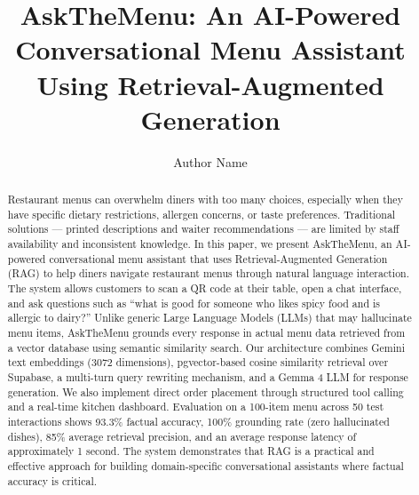 \documentclass[a4paper,fleqn]{cas-dc}
\begin{document}
\let\WriteBookmarks\relax
\def\floatpagepagefraction{1}
\def\textpagefraction{.001}



\title[mode = title]{AskTheMenu: An AI-Powered Conversational Menu Assistant Using Retrieval-Augmented Generation}

\tnotemark[1]


\author[1]{Author Name}
\cormark[1]
\fnmark[1]





\begin{abstract}
Restaurant menus can overwhelm diners with too many choices, especially when they have specific dietary restrictions, allergen concerns, or taste preferences. Traditional solutions --- printed descriptions and waiter recommendations --- are limited by staff availability and inconsistent knowledge. In this paper, we present AskTheMenu, an AI-powered conversational menu assistant that uses Retrieval-Augmented Generation (RAG) to help diners navigate restaurant menus through natural language interaction. The system allows customers to scan a QR code at their table, open a chat interface, and ask questions such as ``what is good for someone who likes spicy food and is allergic to dairy?'' Unlike generic Large Language Models (LLMs) that may hallucinate menu items, AskTheMenu grounds every response in actual menu data retrieved from a vector database using semantic similarity search. Our architecture combines Gemini text embeddings (3072 dimensions), pgvector-based cosine similarity retrieval over Supabase, a multi-turn query rewriting mechanism, and a Gemma 4 LLM for response generation. We also implement direct order placement through structured tool calling and a real-time kitchen dashboard. Evaluation on a 100-item menu across 50 test interactions shows 93.3\% factual accuracy, 100\% grounding rate (zero hallucinated dishes), 85\% average retrieval precision, and an average response latency of approximately 1 second. The system demonstrates that RAG is a practical and effective approach for building domain-specific conversational assistants where factual accuracy is critical.
\end{abstract}
\end{document}
